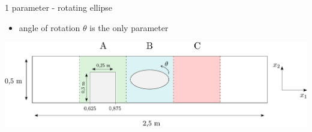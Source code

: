 \documentclass[aspectratio=169,xcolor=dvipsnames]{beamer}
\begin{document}
\begin{frame}{1 parameter - rotating ellipse}
	\begin{itemize}
		\item angle of rotation $ \theta $ is the only parameter
		\vspace{7mm}
	\end{itemize}
	\includegraphics[width=1\linewidth, trim={0 0 0 0}, clip]{Images/elipsa2.pdf}			
\end{frame}
\end{document}

